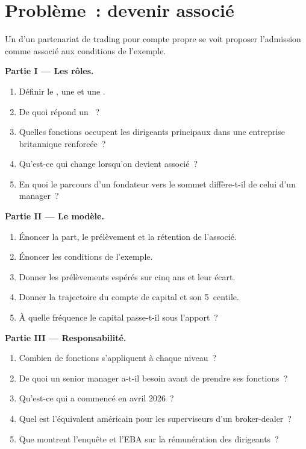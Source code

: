 \section{Problème~: devenir associé}

\begin{problem}\label{pb:in:leadership-roles:1}
Un  d'un partenariat de trading pour compte propre se voit proposer l'admission comme associé aux conditions de l'exemple.

\medskip\noindent\textbf{Partie I --- Les rôles.}
\begin{enumerate}
\item Définir le , une  et une .
\item De quoi répond un ~?
\item Quelles fonctions occupent les dirigeants principaux dans une entreprise britannique renforcée~?
\item Qu'est-ce qui change lorsqu'on devient associé~?
\item En quoi le parcours d'un fondateur vers le sommet diffère-t-il de celui d'un manager~?
\end{enumerate}

\medskip\noindent\textbf{Partie II --- Le modèle.}
\begin{enumerate}[resume]
\item Énoncer la part, le prélèvement et la rétention de l'associé.
\item Énoncer les conditions de l'exemple.
\item Donner les prélèvements espérés sur cinq ans et leur écart.
\item Donner la trajectoire du compte de capital et son 5~centile.
\item À quelle fréquence le capital passe-t-il sous l'apport~?
\end{enumerate}

\medskip\noindent\textbf{Partie III --- Responsabilité.}
\begin{enumerate}[resume]
\item Combien de fonctions s'appliquent à chaque niveau~?
\item De quoi un senior manager a-t-il besoin avant de prendre ses fonctions~?
\item Qu'est-ce qui a commencé en avril 2026~?
\item Quel est l'équivalent américain pour les superviseurs d'un broker-dealer~?
\item Que montrent l'enquête et l'EBA sur la rémunération des dirigeants~?
\end{enumerate}


\end{problem}
